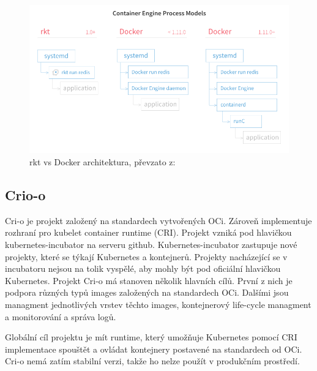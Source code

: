 \begin{figure}[H]
\begin{centering}
\includegraphics[width=1\textwidth]{img/docker_vs_rkt}
\par\end{centering}
\caption{rkt vs Docker architektura, převzato z: \cite{Docker_vs_rkt} \label{fig:docker_vs_rkt}}
\end{figure}

\subsection{Crio-o}
Cri-o je projekt založený na standardech vytvořených OCi. Zároveň implementuje rozhraní pro kubelet container runtime (CRI). Projekt vzniká pod hlavičkou kubernetes-incubator na serveru github\cite{kube_incubator}. Kubernetes-incubator zastupuje nové projekty, které se týkají Kubernetes a kontejnerů. Projekty nacházející se v incubatoru nejsou na tolik vyspělé, aby mohly být pod oficiální hlavičkou Kubernetes. Projekt Cri-o má stanoven několik hlavních cílů. První z nich je podpora různých typů images založených na standardech OCi. Dalšími jsou managment jednotlivých vrstev těchto images, kontejnerový life-cycle managment a monitorování a správa logů\cite{cri_o_inc}. 

Globální cíl projektu je mít runtime, který umožňuje Kubernetes pomocí CRI implementace spouštět a ovládat kontejnery postavené na standardech od OCi. Cri-o nemá zatím stabilní verzi\cite{cri_o}, takže ho nelze použít v produkčním prostředí.


